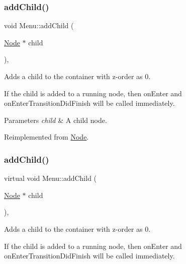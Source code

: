 \subsubsection{\texorpdfstring{add\+Child()}{addChild()}\hspace{0.1cm}{\footnotesize\ttfamily [1/8]}}
{\footnotesize\ttfamily void Menu\+::add\+Child (\begin{DoxyParamCaption}\item[{\hyperlink{classNode}{Node} $\ast$}]{child }\end{DoxyParamCaption})\hspace{0.3cm}{\ttfamily [override]}, {\ttfamily [virtual]}}

Adds a child to the container with z-\/order as 0.

If the child is added to a \textquotesingle{}running\textquotesingle{} node, then \textquotesingle{}on\+Enter\textquotesingle{} and \textquotesingle{}on\+Enter\+Transition\+Did\+Finish\textquotesingle{} will be called immediately.


\begin{DoxyParams}{Parameters}
{\em child} & A child node. \\
\hline
\end{DoxyParams}


Reimplemented from \hyperlink{classNode_a132699398b350e83b548a5645e69beb0}{Node}.

\mbox{\label{classMenu_af957ef275f6fe75ee78876cbbea924e8}} 
\subsubsection{\texorpdfstring{add\+Child()}{addChild()}\hspace{0.1cm}{\footnotesize\ttfamily [2/8]}}
{\footnotesize\ttfamily virtual void Menu\+::add\+Child (\begin{DoxyParamCaption}\item[{\hyperlink{classNode}{Node} $\ast$}]{child }\end{DoxyParamCaption})\hspace{0.3cm}{\ttfamily [override]}, {\ttfamily [virtual]}}

Adds a child to the container with z-\/order as 0.

If the child is added to a \textquotesingle{}running\textquotesingle{} node, then \textquotesingle{}on\+Enter\textquotesingle{} and \textquotesingle{}on\+Enter\+Transition\+Did\+Finish\textquotesingle{} will be called immediately.


